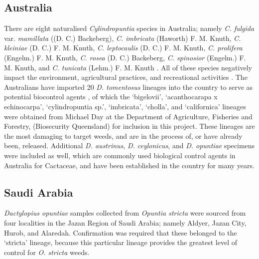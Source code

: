\subsection{Australia}
There are eight naturalised \textit{Cylindropuntia} species in Australia; namely \textit{C. fulgida} var. \textit{mamillata} ((D. C.) Backeberg), \textit{C. imbricata} (Haworth) F. M. Knuth, \textit{C. kleiniae} (D. C.) F. M. Knuth, \textit{C. leptocaulis} (D. C.) F. M. Knuth, \textit{C. prolifera} (Engelm.) F. M. Knuth, \textit{C. rosea} (D. C.) Backeberg, \textit{C. spinosior} (Engelm.) F. M. Knuth, and \textit{C. tunicata} (Lehm.) F. M. Knuth \citep{Jones2015}. All of these species negatively impact the environment, agricultural practices, and recreational activities \citep{Lloyd2014, Jones2015}. The Australians have imported 20 \textit{D. tomentosus} lineages into the country to serve as potential biocontrol agents \citep{isbcw2018Jones}, of which the `bigelovii', `acanthocarapa x echinocarpa', `cylindropuntia sp.', `imbricata', `cholla', and `californica' lineages
were obtained from Michael Day at the Department of Agriculture, Fisheries and Forestry, (Biosecurity Queensland) for inclusion in this project. These lineages are the most damaging to target weeds, and are in the process of, or have already been, released. Additional \textit{D. austrinus}, \textit{D. ceylonicus}, and \textit{D. opuntiae} specimens were included as well, which are commonly used biological control agents in Australia for Cactaceae, and have been established in the country for many years.

\subsection{Saudi Arabia}

\textit{Dactylopius opuntiae} samples collected from \textit{Opuntia stricta} were sourced from four localities in the Jazan Region of Saudi Arabia; namely Aldyer, Jazan City, Hurob, and Alaredah. Confirmation was required that these belonged to the `stricta' lineage, because this particular lineage provides the greatest level of control for \textit{O. stricta} weeds.


